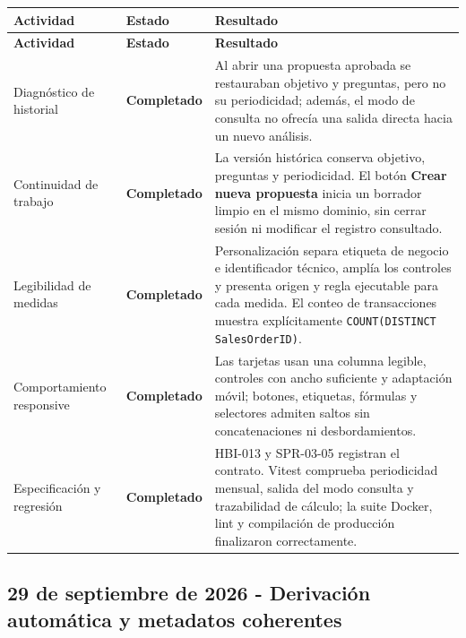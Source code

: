 \documentclass[11pt,letterpaper]{article}
\newcommand{\statusok}{\textcolor{deepgreen}{\textbf{Completado}}}
\newcommand{\file}[1]{\texttt{#1}}
\begin{document}
\begin{longtable}{@{}p{}p{}p{}@{}}
  \toprule
  \textbf{Actividad} & \textbf{Estado} & \textbf{Resultado} \\
  \midrule
  \endfirsthead
  \toprule
  \textbf{Actividad} & \textbf{Estado} & \textbf{Resultado} \\
  \midrule
  \endhead
  Diagnóstico de historial & \statusok & Al abrir una propuesta aprobada se restauraban objetivo y preguntas, pero no su periodicidad; además, el modo de consulta no ofrecía una salida directa hacia un nuevo análisis. \\
  Continuidad de trabajo & \statusok & La versión histórica conserva objetivo, preguntas y periodicidad. El botón \textbf{Crear nueva propuesta} inicia un borrador limpio en el mismo dominio, sin cerrar sesión ni modificar el registro consultado. \\
  Legibilidad de medidas & \statusok & Personalización separa etiqueta de negocio e identificador técnico, amplía los controles y presenta origen y regla ejecutable para cada medida. El conteo de transacciones muestra explícitamente \file{COUNT(DISTINCT SalesOrderID)}. \\
  Comportamiento responsive & \statusok & Las tarjetas usan una columna legible, controles con ancho suficiente y adaptación móvil; botones, etiquetas, fórmulas y selectores admiten saltos sin concatenaciones ni desbordamientos. \\
  Especificación y regresión & \statusok & HBI-013 y SPR-03-05 registran el contrato. Vitest comprueba periodicidad mensual, salida del modo consulta y trazabilidad de cálculo; la suite Docker, lint y compilación de producción finalizaron correctamente. \\
  \bottomrule
\end{longtable}

\subsection{29 de septiembre de 2026 - Derivación automática y metadatos coherentes}
\end{document}
